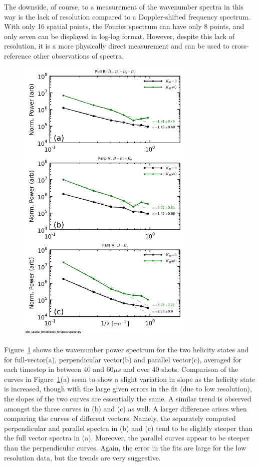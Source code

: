 \documentclass[aip,prl,amsmath,amssymb,reprint,superscriptaddress]{revtex4-1} %
\begin{document}
The downside, of course, to a measurement of the wavenumber spectra in this way is the lack of resolution compared to a Doppler-shifted frequency spectrum. With only 16 spatial points, the Fourier spectrum can have only 8 points, and only seven can be displayed in log-log format. However, despite this lack of resolution, it is a more physically direct measurement and can be used to cross-reference other observations of spectra.

\begin{figure}[!htbp]
\centerline{
\includegraphics[width=8.5cm]{Bmod_FFTwavenumberspectra_wFits_40t60us}}
\caption{\label{fig:wavenumber_spectra}}
\end{figure}

Figure~\ref{fig:wavenumber_spectra} shows the wavenumber power spectrum for the two helicity states and for full-vector(a), perpendicular vector(b) and parallel vector(c), averaged for each timestep in between 40 and 60$\mu s$ and over 40 shots. Comparison of the curves in Figure~\ref{fig:wavenumber_spectra}(a) seem to show a slight variation in slope as the helicity state is increased, though with the large given errors in the fit (due to low resolution), the slopes of the two curves are essentially the same. A similar trend is observed amongst the three curves in (b) and (c) as well. A larger difference arises when comparing the curves of different vectors. Namely, the separately computed perpendicular and parallel spectra in (b) and (c) tend to be slightly steeper than the full vector spectra in (a). Moreover, the parallel curves appear to be steeper than the perpendicular curves. Again, the error in the fits are large for the low resolution data, but the trends are very suggestive.
\end{document}
